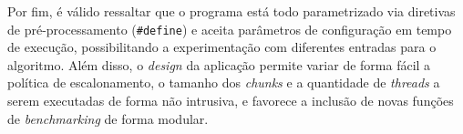 \documentclass[12pt,a4paper]{article}
\begin{document}
Por fim, é válido ressaltar que o programa está todo parametrizado via diretivas
de pré-processamento (\texttt{\#define}) e aceita parâmetros de configuração em
tempo de execução, possibilitando a experimentação com diferentes entradas para
o algoritmo. Além disso, o \textit{design} da aplicação permite variar de forma
fácil a política de escalonamento, o tamanho dos \textit{chunks} e a quantidade
de \textit{threads} a serem executadas de forma não intrusiva, e favorece a
inclusão de novas funções de \textit{benchmarking} de forma modular.



\end{document}
